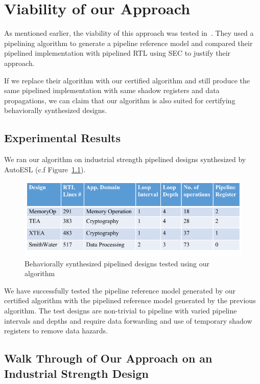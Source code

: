 \chapter{Viability of our Approach}
\label{sec:SEC}

As mentioned earlier, the viability of this approach was tested in~\cite{kechengthesis}. 
They used a pipelining algorithm to generate a pipeline reference model and compared their pipelined 
implementation with pipelined RTL using SEC to justify their approach. 

If we replace their algorithm with our certified algorithm and still produce the same pipelined implementation with same shadow registers and data propagations, we can claim that our algorithm is also suited for certifying behaviorally synthesized designs. 

\section{Experimental Results}

We ran our algorithm on industrial strength pipelined designs synthesized by AutoESL (c.f Figure~\ref{fig:testing}). 


\begin{figure}[h]
\begin{center}
\includegraphics[width=5.5in]{fig-proposal/testing}
\end{center}
\caption{Behaviorally synthesized pipelined designs tested using our algorithm}
\label{fig:testing}
\end{figure}


We have successfully tested the pipeline reference model generated by our certified algorithm with the pipelined reference model generated by the previous algorithm. The test designs are non-trivial to pipeline with varied pipeline intervals and depths and require data forwarding and use of temporary shadow registers to remove data hazards. 

\section{Walk Through of Our Approach on an Industrial Strength Design}

